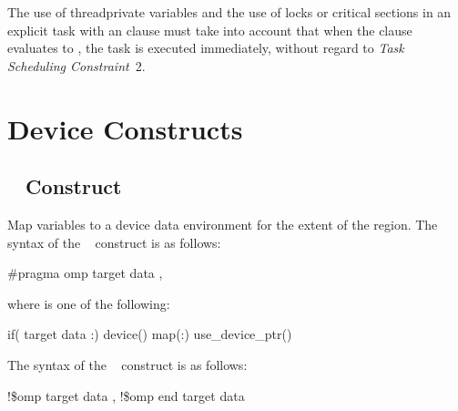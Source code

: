 The use of threadprivate variables and the use of locks or critical sections in an explicit 
task with an  clause must take into account that when the  clause evaluates to 
, the task is executed immediately, without regard to \emph{Task Scheduling Constraint}~2.
\noteend





\section{Device Constructs}
\label{sec:Device Constructs}

\subsection{~ Construct}
\label{subsec:target data Construct}
\summary
 Map variables to a device data environment for the extent of the region.
\syntax
\ccppspecificstart
The syntax of the ~ construct is as follows:

\begin{boxedcode}
\#pragma omp target data \plc{clause[ [ [},\plc{] clause] ... ] new-line}
\end{boxedcode}

\begin{samepage}
where  is one of the following:

\begin{indentedcodelist}
if(\plc{[} target data :\plc{] scalar-expression})
device()
map(\plc{[[map-type-modifier[,]] map-type}:\plc{ ] list})
use\_device\_ptr()
\end{indentedcodelist}
\ccppspecificend
\medskip
\end{samepage}

\fortranspecificstart
The syntax of the ~ construct is as follows:

\begin{boxedcode}
!\$omp target data \plc{clause[ [ [},\plc{] clause] ... ]}
!\$omp end target data
\end{boxedcode}

